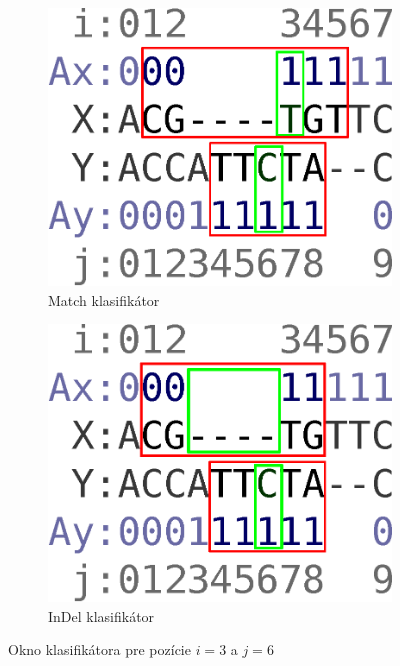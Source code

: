 \begin{figure}[h]
        \centering
        \begin{subfigure}[b]{0.35\textwidth}
                \includegraphics[width=\textwidth]{images/window_m}
                \caption{Match klasifikátor}
                \label{fig:window-m}
        \end{subfigure}%
        \qquad\qquad %
        \begin{subfigure}[b]{0.35\textwidth}
                \includegraphics[width=\textwidth]{images/window_i}
                \caption{InDel klasifikátor}
                \label{fig:window-i}
        \end{subfigure}
        \caption{Okno klasifikátora pre pozície $i = 3$ a $j = 6$}
\end{figure}

